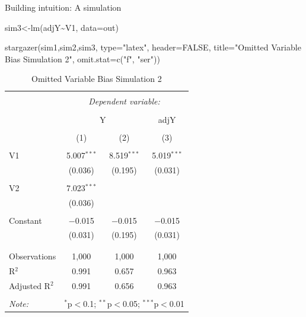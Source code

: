\documentclass[
  ignorenonframetext,
]{beamer}
\newenvironment{Shaded}{\begin{snugshade}}{\end{snugshade}}
\newcommand{\AttributeTok}[1]{\textcolor[rgb]{0.77,0.63,0.00}{#1}}
\newcommand{\ConstantTok}[1]{\textcolor[rgb]{0.00,0.00,0.00}{#1}}
\newcommand{\FunctionTok}[1]{\textcolor[rgb]{0.00,0.00,0.00}{#1}}
\newcommand{\NormalTok}[1]{#1}
\newcommand{\OtherTok}[1]{\textcolor[rgb]{0.56,0.35,0.01}{#1}}
\newcommand{\SpecialCharTok}[1]{\textcolor[rgb]{0.00,0.00,0.00}{#1}}
\newcommand{\StringTok}[1]{\textcolor[rgb]{0.31,0.60,0.02}{#1}}
\begin{document}
\begin{frame}[fragile]{Building intuition: A simulation}
\protect\hypertarget{building-intuition-a-simulation-5}{}
\tiny

\begin{Shaded}
\begin{Highlighting}[]
\NormalTok{sim3}\OtherTok{\textless{}{-}}\FunctionTok{lm}\NormalTok{(adjY}\SpecialCharTok{\textasciitilde{}}\NormalTok{V1, }\AttributeTok{data=}\NormalTok{out)}

\FunctionTok{stargazer}\NormalTok{(sim1,sim2,sim3, }\AttributeTok{type=}\StringTok{"latex"}\NormalTok{, }\AttributeTok{header=}\ConstantTok{FALSE}\NormalTok{, }
          \AttributeTok{title=}\StringTok{"Omitted Variable Bias Simulation 2"}\NormalTok{, }\AttributeTok{omit.stat=}\FunctionTok{c}\NormalTok{(}\StringTok{"f"}\NormalTok{, }\StringTok{"ser"}\NormalTok{))}
\end{Highlighting}
\end{Shaded}

\begin{table}[!htbp] \centering 
  \caption{Omitted Variable Bias Simulation 2} 
  \label{} 
\begin{tabular}{@{\extracolsep{5pt}}lccc} 
\\[-1.8ex]\hline 
\hline \\[-1.8ex] 
 & \multicolumn{3}{c}{\textit{Dependent variable:}} \\ 
\cline{2-4} 
\\[-1.8ex] & \multicolumn{2}{c}{Y} & adjY \\ 
\\[-1.8ex] & (1) & (2) & (3)\\ 
\hline \\[-1.8ex] 
 V1 & 5.007$^{***}$ & 8.519$^{***}$ & 5.019$^{***}$ \\ 
  & (0.036) & (0.195) & (0.031) \\ 
  & & & \\ 
 V2 & 7.023$^{***}$ &  &  \\ 
  & (0.036) &  &  \\ 
  & & & \\ 
 Constant & $-$0.015 & $-$0.015 & $-$0.015 \\ 
  & (0.031) & (0.195) & (0.031) \\ 
  & & & \\ 
\hline \\[-1.8ex] 
Observations & 1,000 & 1,000 & 1,000 \\ 
R$^{2}$ & 0.991 & 0.657 & 0.963 \\ 
Adjusted R$^{2}$ & 0.991 & 0.656 & 0.963 \\ 
\hline 
\hline \\[-1.8ex] 
\textit{Note:}  & \multicolumn{3}{r}{$^{*}$p$<$0.1; $^{**}$p$<$0.05; $^{***}$p$<$0.01} \\ 
\end{tabular} 
\end{table} 
\normalsize
\end{frame}
\end{document}
